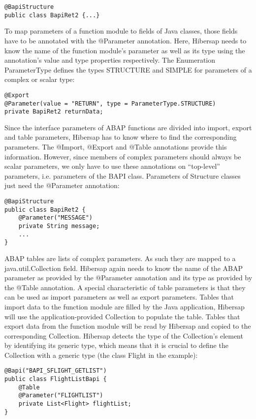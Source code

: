 \begin{lstlisting}
@BapiStructure 
public class BapiRet2 {...}
\end{lstlisting}

To map parameters of a function module to fields of Java classes, those fields have to be annotated with the @Parameter annotation. Here, Hibersap needs to know the name of the function module's parameter as well as its type using the annotation's value and type properties respectively. The Enumeration ParameterType defines the types STRUCTURE and SIMPLE for parameters of a complex or scalar type:

\begin{lstlisting}
@Export 
@Parameter(value = "RETURN", type = ParameterType.STRUCTURE) 
private BapiRet2 returnData;
\end{lstlisting}

Since the interface parameters of ABAP functions are divided into import, export and table parameters, Hibersap has to know where to find the corresponding parameters. The @Import, @Export and @Table annotations provide this information. However, since members of complex parameters should always be scalar parameters, we only have to use these annotations on ``top-level'' parameters, i.e. parameters of the BAPI class. Parameters of Structure classes just need the @Parameter annotation:

\begin{lstlisting}
@BapiStructure 
public class BapiRet2 {
    @Parameter("MESSAGE") 
    private String message; 
    ...
}
\end{lstlisting}

ABAP tables are lists of complex parameters. As such they are mapped to a java.util.Collection field. Hibersap again needs to know the name of the ABAP parameter as provided by the @Parameter annotation and its type as provided by the @Table annotation. A special characteristic of table parameters is that they can be used as import parameters as well as export parameters. Tables that import data to the function module are filled by the Java application, Hibersap will use the application-provided Collection to populate the table. Tables that export data from the function module will be read by Hibersap and copied to the corresponding Collection. Hibersap detects the type of the Collection's element by identifying its generic type, which means that it is crucial to define the Collection with a generic type (the class Flight in the example): 

\begin{lstlisting}
@Bapi("BAPI_SFLIGHT_GETLIST") 
public class FlightListBapi {
    @Table 
    @Parameter("FLIGHTLIST") 
    private List<Flight> flightList;
}
\end{lstlisting}

